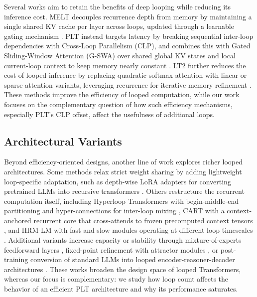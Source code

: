 \documentclass{llmxive}
\begin{document}
Several works aim to retain the benefits of deep looping while reducing its inference cost. MELT decouples recurrence depth from memory by maintaining a single shared KV cache per layer across loops, updated through a learnable gating mechanism \citep{vendrell2026memoryefficient}. PLT instead targets latency by breaking sequential inter-loop dependencies with Cross-Loop Parallelism (CLP), and combines this with Gated Sliding-Window Attention (G-SWA) over shared global KV states and local current-loop context to keep memory nearly constant \citep{wu2025parallel}. LT2 further reduces the cost of looped inference by replacing quadratic softmax attention with linear or sparse attention variants, leveraging recurrence for iterative memory refinement \citep{deng2026lt2}. These methods improve the efficiency of looped computation, while our work focuses on the complementary question of how such efficiency mechanisms, especially PLT's CLP offset, affect the usefulness of additional loops.

\subsection{Architectural Variants}
\label{sec:related-variants}

Beyond efficiency-oriented designs, another line of work explores richer looped architectures. Some methods relax strict weight sharing by adding lightweight loop-specific adaptation, such as depth-wise LoRA adapters for converting pretrained LLMs into recursive transformers \citep{bae2024relaxed}. Others restructure the recurrent computation itself, including Hyperloop Transformers with begin-middle-end partitioning and hyper-connections for inter-loop mixing \citep{zeitoun2026hyperloop}, CART with a context-anchored recurrent core that cross-attends to frozen precomputed context tensors \citep{capps2026cart}, and HRM-LM with fast and slow modules operating at different loop timescales \citep{han2026hierarchical}. Additional variants increase capacity or stability through mixture-of-experts feedforward layers \citep{csords2024moeut}, fixed-point refinement with attractor modules \citep{feinashley2026solve}, or post-training conversion of standard LLMs into looped encoder-reasoner-decoder architectures \citep{park2026loopus}. These works broaden the design space of looped Transformers, whereas our focus is complementary: we study how loop count affects the behavior of an efficient PLT architecture and why its performance saturates.

\end{document}
